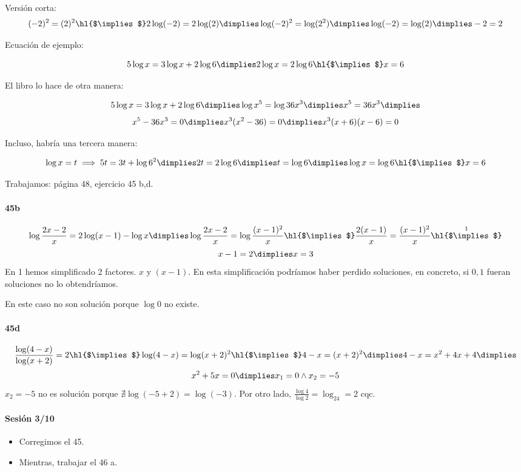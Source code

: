 \documentclass[palatino,nosec]{Docencia}
\newcommand{\cimplies}{\text{\hl{$\implies$}}}
\begin{document}
Versión corta:
\[
	(-2)^2 = (2)^2 \text{\hl{$\implies$}} 2\log(-2) = 2\log(2) \dimplies \log(-2)^2 = \log(2^2) \dimplies \log(-2) = \log(2) \dimplies -2=2
\]

Ecuación de ejemplo:

\[
	5\log x=3\log x+2\log 6 \dimplies 2\log x=2\log6 \text{\hl{$\implies$}} x=6
\]


El libro lo hace de otra manera:

\[
	5\log x=3\log x+2\log 6 \dimplies \log x^5=\log36x^3 \dimplies x^5=36x^3 \dimplies
\]
\[
	x^5-36x^3 = 0 \dimplies x^3(x^2-36) = 0 \dimplies x^3(x+6)(x-6) = 0
\]

Incluso, habría una tercera manera:

\[
	\log x=t \implies 5t=3t+\log6^2 \dimplies 2t=2\log6 \dimplies t=\log6 \dimplies \log x=\log6 \text{\hl{$\implies$}} x=6
\]

Trabajamos: página 48, ejercicio 45 b,d.

\paragraph{45b}
\[
	\log\frac{2x-2}{x} = 2\log(x-1)-\log x \dimplies \log \frac{2x-2}{x}=\log\frac{(x-1)^2}{x} \cimplies \frac{2(x-1)}{x} = \frac{(x-1)^2}{x} \overset{1}{\cimplies}
	\]
	\[ 
	x-1=2 \dimplies x=3
\]
En 1 hemos simplificado 2 factores. $x$ y $(x-1)$. En esta simplificación podríamos haber perdido soluciones, en concreto, si $0,1$ fueran soluciones no lo obtendríamos. 

En este caso no son solución porque $\log 0$ no existe.

\paragraph{45d}
\[
\frac{\log (4-x)}{\log(x+2)}=2 \cimplies \log(4-x) = \log(x+2)^2 \cimplies 4-x=(x+2)^2 \dimplies 4-x=x^2+4x+4 \dimplies
	\]
	\[ x^2+5x=0 \dimplies x_1=0 \wedge x_2=-5
\]
$x_2=-5$ no es solución porque $\nexists\log(-5+2)=\log(-3)$. Por otro lado, $\frac{\log4}{\log2} = \log_24=2$ cqc.

\paragraph{Sesión 3/10}
\begin{itemize}
	\item Corregimos el 45.
	\item Mientras, trabajar el 46 a.

\end{itemize}
\end{document}
